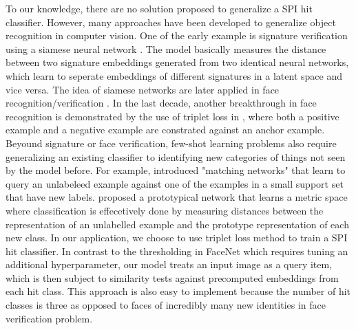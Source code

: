 To our knowledge, there are no solution proposed to generalize a SPI hit
classifier.  However, many approaches have been developed to generalize object
recognition in computer vision.  One of the early example is signature
verification using a siamese neural network
\cite{bromleySignatureVerificationUsing1994}.  The model basically measures the
distance between two signature embeddings generated from two identical neural
networks, which learn to seperate embeddings of different signatures in a latent
space and vice versa.  The idea of siamese networks are later applied in face
recognition/verification \cite{chopraLearningSimilarityMetric2005}.  In the last
decade, another breakthrough in face recognition is demonstrated by the use of
triplet loss in \cite{kochSiameseNeuralNetworks2015a}, where both a positive
example and a negative example are constrated against an anchor example. Beyound
signature or face verification, few-shot learning problems also require
generalizing an existing classifier to identifying new categories of things not
seen by the model before.  For example, \cite{vinyalsMatchingNetworksOne2017}
introduced "matching networks" that learn to query an unlabeleed example against
one of the examples in a small support set that have new labels.
\cite{snellPrototypicalNetworksFewshot2017} proposed a prototypical network that
learns a metric space where classification is effecetively done by measuring
distances between the representation of an unlabelled example and the prototype
representation of each new class.  In our application, we choose to use triplet
loss method to train a SPI hit classifier.  In contrast to the thresholding in
FaceNet which requires tuning an additional hyperparameter, our model treats an
input image as a query item, which is then subject to similarity tests against
precomputed embeddings from each hit class.  This approach is also easy to
implement because the number of hit classes is three as opposed to faces of
incredibly many new identities in face verification problem.  
